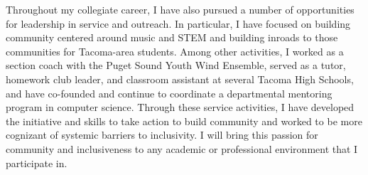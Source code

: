 Throughout my collegiate career, I have also pursued a number of opportunities for leadership in service and outreach.
In particular, I have focused on building community centered around music and STEM and building inroads to those communities for Tacoma-area students.
Among other activities, I worked as a section coach with the Puget Sound Youth Wind Ensemble, served as a tutor, homework club leader, and classroom assistant at several Tacoma High Schools, and have co-founded and continue to coordinate a departmental mentoring program in computer science.
Through these service activities, I have developed the initiative and skills to take action to build community and worked to be more cognizant of systemic barriers to inclusivity.
I will bring this passion for community and inclusiveness to any academic or professional environment that I participate in.
